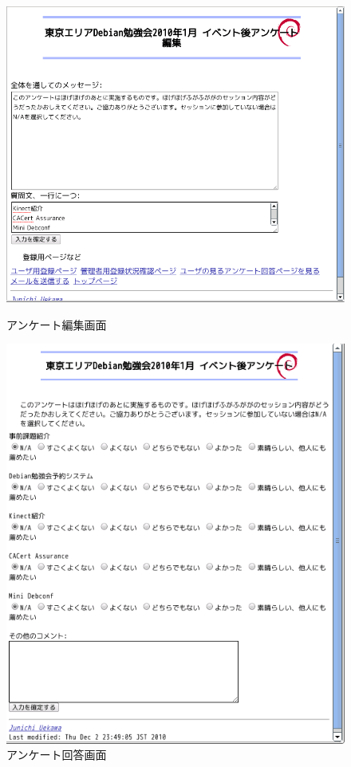 \documentclass[mingoth,a4paper]{jsarticle}
\begin{document}
\begin{figure}[ht]
\begin{minipage}{0.4\hsize}
 \begin{center}
  \includegraphics[width=1\hsize]{image201101/enquete-edit.png}
  \caption{アンケート編集画面}
 \end{center}
\end{minipage}
\begin{minipage}{0.5\hsize}
 \begin{center}
  \includegraphics[width=1\hsize]{image201101/enquete-respond.png}
  \caption{アンケート回答画面}
 \end{center}
\end{minipage}
\end{figure}
\end{document}
